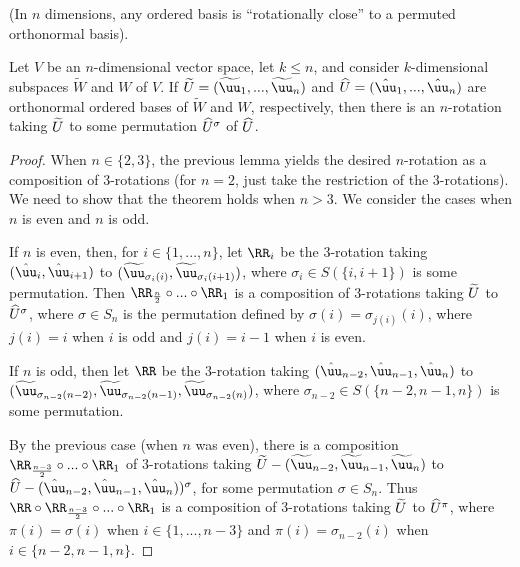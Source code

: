 \begin{theorem}
\label{ch::exterior_pwrs::thm::n_rot_acts_on_orthonormal_basis}
     (In $n$ dimensions, any ordered basis is ``rotationally close'' to a permuted orthonormal basis).
     
     Let $V$ be an $n$-dimensional vector space, let $k \leq n$, and consider $k$-dimensional subspaces $\widetilde{W}$ and $W$ of $V$. If $\tU = ( \tuu_1, ..., \tuu_n )$ and $\hU = ( \huu_1, ..., \huu_n )$ are orthonormal ordered bases of $\widetilde{W}$ and $W$, respectively, then there is an $n$-rotation taking $\widetilde{U}$ to some permutation $\widehat{U}^\sigma$ of $\widehat{U}$. 
\end{theorem}

\begin{proof}
   When $n \in \{2, 3\}$, the previous lemma yields the desired $n$-rotation as a composition of $3$-rotations (for $n = 2$, just take the restriction of the $3$-rotations). We need to show that the theorem holds when $n > 3$. We consider the cases when $n$ is even and $n$ is odd.
   
   If $n$ is even, then, for $i \in \{1, ..., n\}$, let $\RR_i$ be the $3$-rotation taking $( \huu_i,  \huu_{i + 1} )$ to $( \tuu_{\sigma_i(i)},  \tuu_{\sigma_i(i + 1)} )$, where $\sigma_i \in S(\{i, i + 1\})$ is some permutation. Then $\RR_{\frac{n}{2}} \circ ... \circ \RR_1$ is a composition of $3$-rotations taking $\widetilde{U}$ to $\widehat{U}^\sigma$, where $\sigma \in S_n$ is the permutation defined by $\sigma(i) = \sigma_{j(i)}(i)$, where $j(i) = i$ when $i$ is odd and $j(i) = i - 1$ when $i$ is even.
            
    If $n$ is odd, then let $\RR$ be the $3$-rotation taking $( \huu_{n - 2}, \huu_{n - 1}, \huu_n )$ to \\ $( \tuu_{\sigma_{n - 2}(n - 2)}, \tuu_{\sigma_{n - 2}(n - 1)}, \tuu_{\sigma_{n - 2}(n)} )$, where $\sigma_{n - 2} \in S(\{n - 2, n - 1, n\})$ is some permutation.
            
    By the previous case (when $n$ was even), there is a composition $\RR_{\frac{n - 3}{2}} \circ ... \circ \RR_1$ of $3$-rotations taking $\tU - (\tuu_{n - 2}, \tuu_{n - 1}, \tuu_n)$ to $\hU - (\huu_{n - 2}, \huu_{n - 1}, \huu_n))^\sigma$, for some permutation $\sigma \in S_n$. Thus $\RR \circ \RR_{\frac{n - 3}{2}} \circ ... \circ \RR_1$ is a composition of $3$-rotations taking $\widetilde{U}$ to $\widehat{U}^\pi$, where $\pi(i) = \sigma(i)$ when $i \in \{1, ..., n - 3\}$ and $\pi(i) = \sigma_{n - 2}(i)$ when $i \in \{n - 2, n - 1, n\}$.
\end{proof}

